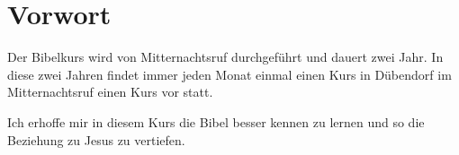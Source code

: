 \section{Vorwort}

Der Bibelkurs wird von Mitternachtsruf durchgeführt und dauert zwei Jahr. In diese zwei Jahren findet immer jeden Monat einmal einen Kurs in Dübendorf im Mitternachtsruf einen Kurs vor statt.

Ich erhoffe mir in diesem Kurs die Bibel besser kennen zu lernen und so die Beziehung zu Jesus zu vertiefen.







